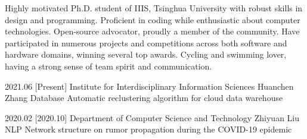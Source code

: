 \documentclass{resume}
\begin{document}
\makeheader

\vspace{0.5em}
Highly motivated Ph.D. student of IIIS, Tsinghua University with robust skills in design and programming.
Proficient in coding while enthusiastic about computer technologies.
Open-source advocator, proudly a member of the  community.
Have participated in numerous projects and competitions across both software and hardware domains, winning several top awards.
Cycling and swimming lover, having a strong sense of team spirit and communication.

\begin{competences}[10em]
  \separator{0.1em}


\end{competences}

\begin{educations}
  \separator{0.2em}

  \education%
    {2021.06}%
    [Present]%
    {Institute for Interdisciplinary Information Sciences}%
    {Huanchen Zhang}%
    {Database}%
    {Automatic reclustering algorithm for cloud data warehouse}
  
  \separator{0.5ex}
  \education%
    {2020.02}%
    [2020.10]%
    {Department of Computer Science and Technology}%
    {Zhiyuan Liu}%
    {NLP}%
    {Network structure on rumor propagation during the COVID-19 epidemic}
\end{educations}
\end{document}
